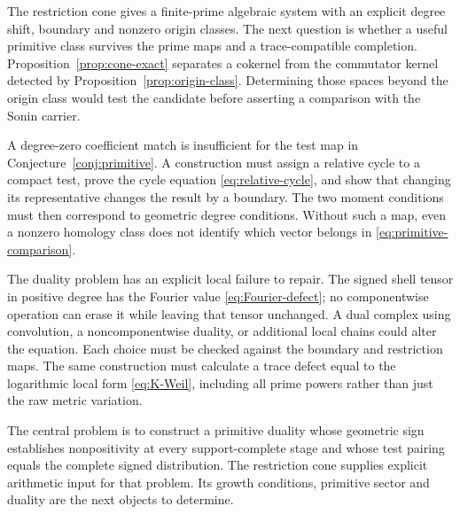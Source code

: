 \documentclass[11pt,letterpaper]{article}
\theoremstyle{definition}
\theoremstyle{remark}
\begin{document}
The restriction cone gives a finite-prime algebraic system with
an explicit degree shift, boundary and nonzero origin classes.
The next question is whether a useful primitive class survives
the prime maps and a trace-compatible completion.
Proposition~\ref{prop:cone-exact} separates a cokernel from the
commutator kernel detected by Proposition~\ref{prop:origin-class}.
Determining those spaces beyond the origin class would test the
candidate before asserting a comparison with the Sonin carrier.

A degree-zero coefficient match is insufficient for the test
map in Conjecture~\ref{conj:primitive}. A construction must
assign a relative cycle to a compact test, prove the cycle
equation \eqref{eq:relative-cycle}, and show that changing its
representative changes the result by a boundary. The two
moment conditions must then correspond to geometric degree
conditions. Without such a map, even a nonzero homology class
does not identify which vector belongs in
\eqref{eq:primitive-comparison}.

The duality problem has an explicit local failure to repair.
The signed shell tensor in positive degree has the Fourier
value \eqref{eq:Fourier-defect}; no componentwise operation
can erase it while leaving that tensor unchanged. A dual
complex using convolution, a noncomponentwise duality, or
additional local chains could alter the equation. Each choice
must be checked against the boundary and restriction maps.
The same construction must calculate a trace defect equal to
the logarithmic local form \eqref{eq:K-Weil}, including all
prime powers rather than just the raw metric variation.

The central problem is to construct a primitive duality whose
geometric sign establishes nonpositivity at every support-complete
stage and whose test pairing equals the complete signed
distribution. The restriction cone supplies explicit arithmetic
input for that problem. Its growth conditions, primitive sector
and duality are the next objects to determine.
\end{document}
